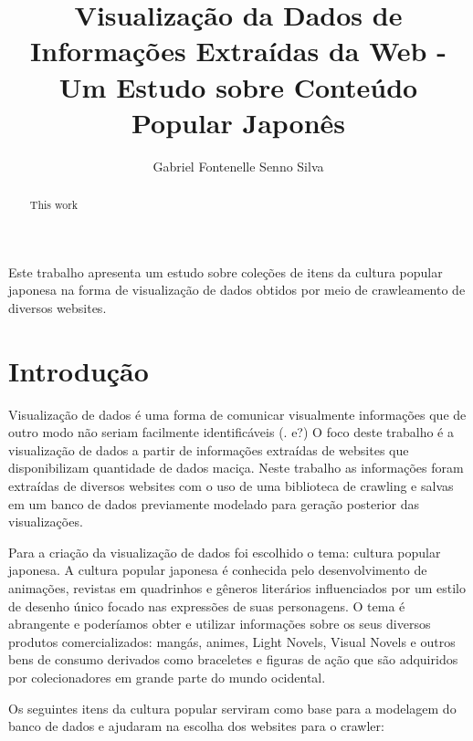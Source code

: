 \documentclass[12pt]{article}
\title{Visualização da Dados de Informações Extraídas da Web - Um Estudo sobre Conteúdo Popular Japonês}
\author{Gabriel Fontenelle Senno Silva\inst{1}}
\begin{document}
 
\maketitle

\begin{abstract}

This work 
\end{abstract}
     
\begin{resumo} 


Este trabalho apresenta um estudo sobre coleções de itens da cultura popular japonesa na forma de visualização de dados obtidos por meio de crawleamento de diversos websites.

\end{resumo}


\section{Introdução}

Visualização de dados é uma forma de comunicar visualmente informações que de outro modo não seriam facilmente identificáveis (. e?) O foco deste trabalho é a visualização de dados a partir de informações extraídas de websites que disponibilizam quantidade de dados maciça. Neste trabalho as informações foram extraídas de diversos websites com o uso de uma biblioteca de crawling e salvas em um banco de dados previamente modelado para geração posterior das visualizações.

Para a criação da visualização de dados foi escolhido o tema: cultura popular japonesa. A cultura popular japonesa é conhecida pelo desenvolvimento de animações, revistas em quadrinhos e gêneros literários influenciados por um estilo de desenho único focado nas expressões de suas personagens. O tema é abrangente e poderíamos obter e utilizar informações sobre os seus diversos produtos comercializados: mangás, animes, Light Novels, Visual Novels e outros bens de consumo derivados como braceletes e figuras de ação que são adquiridos por colecionadores em grande parte do mundo ocidental.

Os seguintes itens da cultura popular serviram como base para a modelagem do banco de dados e ajudaram na escolha dos websites para o crawler:
\end{document}
